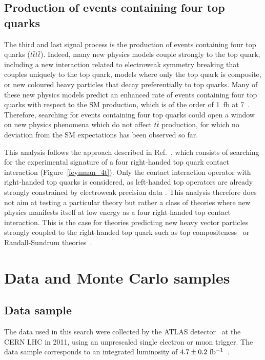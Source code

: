 \subsection{Production of events containing four top quarks}
The third and last signal process is the production of events containing four top quarks ($t\bar{t}t\bar{t}$). 
Indeed, many new physics models couple strongly to the top quark, including a new interaction 
related to electroweak symmetry breaking that couples uniquely to the top quark,
models where only the top quark is composite, 
or new coloured heavy particles that decay preferentially
to top quarks. Many of these new physics models predict an enhanced rate
of events containing four top quarks with respect to the SM production, which is of the order of 1~fb 
at 7~\TeV. Therefore, searching for events containing four top quarks could open
a window on new physics phenomena which do not affect $t\bar{t}$ production, for which
no deviation from the SM expectations has been observed so far.

This analysis follows the approach described in Ref.~\cite{Degrande:2010kt}, which consists of searching 
for the experimental signature of a four right-handed top quark contact interaction 
(Figure~\ref{feynman_4t}). Only the contact interaction operator with right-handed top quarks 
is considered, as left-handed top operators are already strongly constrained by electroweak precision 
data \cite{PhysRevD.51.3888}. This analysis therefore does not aim at testing a particular theory 
but rather a class of theories where new physics manifests itself at low energy as a four right-handed 
top contact interaction. This is the case for theories predicting new heavy vector particles strongly 
coupled to the right-handed top quark such as top 
compositeness~\cite{PhysRevD.78.074026,1126-6708-2008-04-087,1126-6708-2009-05-022} or 
Randall-Sundrum theories~\cite{Guchait:2007jd}.

\section{Data and Monte Carlo samples}\label{sect:samples}

\subsection{Data sample}
The data used in this search were collected by the ATLAS detector~\cite{1748-0221-3-08-S08003} 
at the CERN LHC in 2011, using an
unprescaled single electron or muon trigger. The data sample corresponds to an integrated luminosity of
$4.7\pm0.2~\mbox{fb$^{-1}$}{}$~\cite{Aad:2011dr,ATLAS-CONF-2011-116}.

